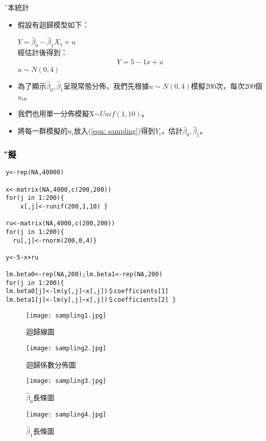 \documentclass[xcolor=dvipsnames]{beamer}
\begin{document}
\begin{frame}{\H 樣本統計}
\begin{itemize}
\item 假設有迴歸模型如下：
\begin{center}
$Y=\hat{\beta}_{0} - \hat{\beta}_{1}X_{1}+u$\\
\hspace{-16em}經估計後得到：\\
\begin{align}
Y=5 - 1x+u
\label{eqn: sampling}
\end{align}
$ u\sim N(0,4) $
\end{center}
\item 為了顯示$ \hat{\beta}_{0}, \hat{\beta}_{1} $呈現常態分佈，我們先根據$ u\sim N(0,4) $模擬200次，每次200個$u_{i}$。
\item 我們也用單一分佈模擬X$\sim  Unif(1,10)$。
\item 將每一群模擬的$u_{i}$放入(\ref{eqn: sampling})得到$Y_{i}$，估計$ \hat{\beta}_{0}, \hat{\beta}_{1} $。
\end{itemize}
\end{frame}
\begin{frame}[fragile=singleslide]\frametitle{\H 模擬}
\begin{Verbatim}[frame=single,label=R code,
formatcom=\color{blue},fontseries=b,xleftmargin=2mm]
y<-rep(NA,40000)

x<-matrix(NA,4000,c(200,200))
for(j in 1:200){
    x[,j]<-runif(200,1,10) }

ru<-matrix(NA,4000,c(200,200))
for(j in 1:200){
  ru[,j]<-rnorm(200,0,4)}

y<-5-x+ru

lm.beta0<-rep(NA,200);lm.beta1<-rep(NA,200)
for(j in 1:200){
lm.beta0[j]<-lm(y[,j]~x[,j])＄coefficients[1]
lm.beta1[j]<-lm(y[,j]~x[,j])＄coefficients[2] }
\end{Verbatim}
\end{frame}
\begin{frame}
\begin{figure}
\texttt{[image: sampling1.jpg]}
\caption{迴歸線圖}
\end{figure}
\end{frame}
\begin{frame}
\begin{figure}
\texttt{[image: sampling2.jpg]}
\caption{迴歸係數分佈圖}
\end{figure}
\end{frame}
\begin{frame}
\begin{figure}
\texttt{[image: sampling3.jpg]}
\caption{$\hat{\beta}_{0} $長條圖}
\end{figure}
\end{frame}
\begin{frame}
\begin{figure}
\texttt{[image: sampling4.jpg]}
\caption{$\hat{\beta}_{1} $長條圖}
\end{figure}
\end{frame}
\end{document}
